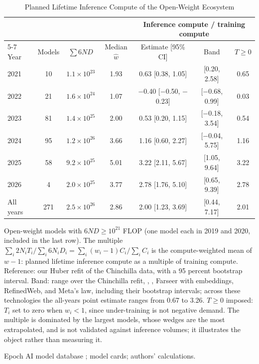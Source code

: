 \begin{table}[tp]
\centering
\caption{Planned Lifetime Inference Compute of the Open-Weight Ecosystem}
\label{tab:app-aggregate}
\footnotesize
\setlength{\tabcolsep}{3pt}
\begin{tabular}{@{}lcccccc@{}}
\toprule
 & & & & \multicolumn{3}{c}{Inference compute / training compute} \\
\cmidrule(l){5-7}
Year & Models & $\sum 6ND$ & Median $\hat w$ & Estimate [95\% CI] & Band & $T\geq0$ \\
\midrule
2021 & 10 & $1.1\times10^{23}$ & 1.93 & 0.63 [0.38, 1.05] & [0.20, 2.58] & 0.65 \\
2022 & 21 & $1.6\times10^{24}$ & 1.07 & $-$0.40 [$-$0.50, $-$0.23] & [$-$0.68, 0.99] & 0.03 \\
2023 & 81 & $1.4\times10^{25}$ & 2.00 & 0.53 [0.20, 1.15] & [$-$0.18, 3.54] & 0.54 \\
2024 & 95 & $1.2\times10^{26}$ & 3.66 & 1.16 [0.60, 2.27] & [$-$0.04, 5.75] & 1.16 \\
2025 & 58 & $9.2\times10^{25}$ & 5.01 & 3.22 [2.11, 5.67] & [1.05, 9.64] & 3.22 \\
2026 & 4 & $2.0\times10^{25}$ & 3.77 & 2.78 [1.76, 5.10] & [0.65, 9.39] & 2.78 \\
\addlinespace
All years & 271 & $2.5\times10^{26}$ & 2.86 & 2.00 [1.23, 3.69] & [0.44, 7.17] & 2.01 \\
\bottomrule
\end{tabular}
\par\smallskip
\begin{tablenotes}Open-weight models with $6ND\geq10^{21}$ FLOP (one model each in 2019 and 2020, included in the last
row). The multiple $\sum_i2N_iT_i/\sum_i6N_iD_i=\sum_i(w_i-1)C_i/\sum_iC_i$ is the compute-weighted mean of $w-1$:
planned lifetime inference compute as a multiple of training compute. Reference: our Huber refit of the Chinchilla
data, with a 95 percent bootstrap interval. Band: range over the Chinchilla refit, \citet{besiroglu2024chinchilla},
\citet{hoffmann2022training}, Farseer with embeddings, \citet{gadre2024language} RefinedWeb, and Meta's law, including
their bootstrap intervals; across these technologies the all-years point estimate ranges from 0.67 to 3.26.
$T\geq0$ imposed: $T_i$ set to zero when $w_i<1$, since under-training is not negative demand. The multiple is
dominated by the largest models, whose wedges are the most extrapolated, and is not validated against inference
volumes; it illustrates the object rather than measuring it.\end{tablenotes}
\begin{tablenotes}[Source]Epoch AI model database \citep{epochai2026data}; model cards; authors'
calculations.\end{tablenotes}
\end{table}
